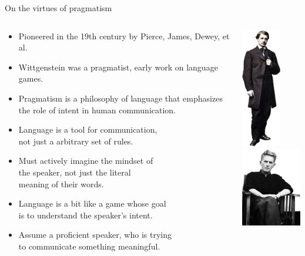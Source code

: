 \documentclass{beamer}
\begin{document}
\begin{frame}[fragile]{On the virtues of pragmatism}
  \begin{columns}[T]
    \begin{column}{0.9\textwidth}
      \begin{itemize}
        \item Pioneered in the 19th century by Pierce, James, Dewey, et al.
        \item Wittgenstein was a pragmatist, early work on language games.
        \item Pragmatism is a philosophy of language that emphasizes the role of intent in human communication.
        \item Language is a tool for communication, \\not just a arbitrary set of rules.
        \item Must actively imagine the mindset of\\ the speaker, not just the literal\\meaning of their words.
        \item Language is a bit like a game whose goal \\is to understand the speaker's intent.
        \item Assume a proficient speaker, who is trying \\to communicate something meaningful.
      \end{itemize}
    \end{column}
    \begin{column}{0.6\textwidth}
      \vspace*{2cm}
      \hspace*{-3cm}
      \includegraphics[width=1.7cm]{../figures/photo_pierce.png}
      \includegraphics[width=2.6cm]{../figures/photo_wittgenstein.png}
    \end{column}
  \end{columns}
\end{frame}
\end{document}
